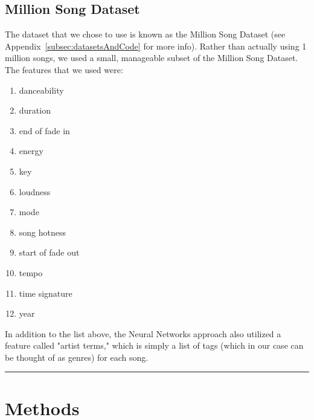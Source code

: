 \documentclass[12pt]{article}
\newcommand{\horizontalLine}{
	\begin{center}
		\hrule width 1.0\textwidth
	\end{center}
}
\begin{document}
\subsection{Million Song Dataset}
\label{subsec:datasetIntro}
The dataset that we chose to use is known as the Million Song Dataset (see Appendix~\ref{subsec:datasetsAndCode} for more info). Rather than actually using 1 million songs, we used a small, manageable subset of the Million Song Dataset. The features that we used were:
\begin{enumerate}
    \item danceability
    \vspace{-3.5mm}
    \item duration
    \vspace{-3.5mm}
    \item end of fade in
    \vspace{-3.5mm}
    \item energy
    \vspace{-3.5mm}
    \item key
    \vspace{-3.5mm}
    \item loudness
    \vspace{-3.5mm}
    \item mode
    \vspace{-3.5mm}
    \item song hotness
    \vspace{-3.5mm}
    \item start of fade out
    \vspace{-3.5mm} 
    \item tempo
    \vspace{-3.5mm}
    \item time signature
    \vspace{-3.5mm}
    \item year
\end{enumerate}
In addition to the list above, the Neural Networks approach also utilized a feature called "artist terms," which is simply a list of tags (which in our case can be thought of as genres) for each song. 

\horizontalLine
\section{Methods}
\label{sec:methods}
\end{document}
